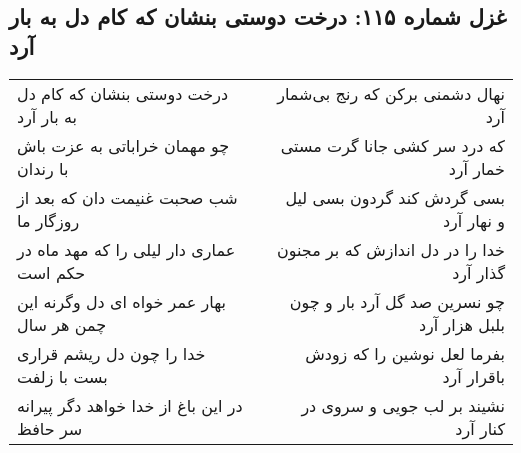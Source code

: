 \begin{center}
\section*{غزل شماره ۱۱۵: درخت دوستی بنشان که کام دل به بار آرد}
\label{sec:sh115}
\begin{longtable}{l p{0.5cm} r}
درخت دوستی بنشان که کام دل به بار آرد
&&
نهال دشمنی برکن که رنج بی‌شمار آرد
\\
چو مهمان خراباتی به عزت باش با رندان
&&
که درد سر کشی جانا گرت مستی خمار آرد
\\
شب صحبت غنیمت دان که بعد از روزگار ما
&&
بسی گردش کند گردون بسی لیل و نهار آرد
\\
عماری دار لیلی را که مهد ماه در حکم است
&&
خدا را در دل اندازش که بر مجنون گذار آرد
\\
بهار عمر خواه ای دل وگرنه این چمن هر سال
&&
چو نسرین صد گل آرد بار و چون بلبل هزار آرد
\\
خدا را چون دل ریشم قراری بست با زلفت
&&
بفرما لعل نوشین را که زودش باقرار آرد
\\
در این باغ از خدا خواهد دگر پیرانه سر حافظ
&&
نشیند بر لب جویی و سروی در کنار آرد
\\
\end{longtable}
\end{center}
